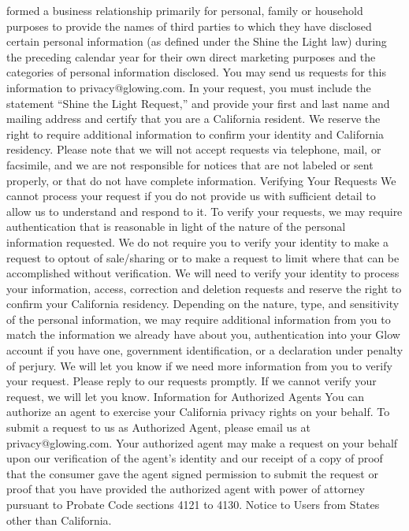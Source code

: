 formed a business relationship primarily for personal, family or
household purposes to provide the names of third parties to which they
have disclosed certain personal information (as defined under the Shine
the Light law) during the preceding calendar year for their own direct
marketing purposes and the categories of personal information
disclosed. You may send us requests for this information
to privacy@glowing.com. In your request, you must include the statement
“Shine the Light Request,” and provide your first and last name and
mailing address and certify that you are a California resident. We
reserve the right to require additional information to confirm your
identity and California residency. Please note that we will not accept
requests via telephone, mail, or facsimile, and we are not responsible for
notices that are not labeled or sent properly, or that do not have
complete information.
Verifying Your Requests
We cannot process your request if you do not provide us with sufficient
detail to allow us to understand and respond to it. To verify your
requests, we may require authentication that is reasonable in light of the
nature of the personal information requested.
We do not require you to verify your identity to make a request to optout of sale/sharing or to make a request to limit where that can be
accomplished without verification.
We will need to verify your identity to process your information, access,
correction and deletion requests and reserve the right to confirm your
California residency. Depending on the nature, type, and sensitivity of
the personal information, we may require additional information from
you to match the information we already have about you, authentication
into your Glow account if you have one, government identification, or a
declaration under penalty of perjury.
We will let you know if we need more information from you to verify your
request. Please reply to our requests promptly. If we cannot verify your
request, we will let you know.
Information for Authorized Agents
You can authorize an agent to exercise your California privacy rights on
your behalf. To submit a request to us as Authorized Agent, please email
us at privacy@glowing.com. Your authorized agent may make a request
on your behalf upon our verification of the agent’s identity and our
receipt of a copy of proof that the consumer gave the agent signed
permission to submit the request or proof that you have provided the
authorized agent with power of attorney pursuant to Probate Code
sections 4121 to 4130.
Notice to Users from States other than California.
